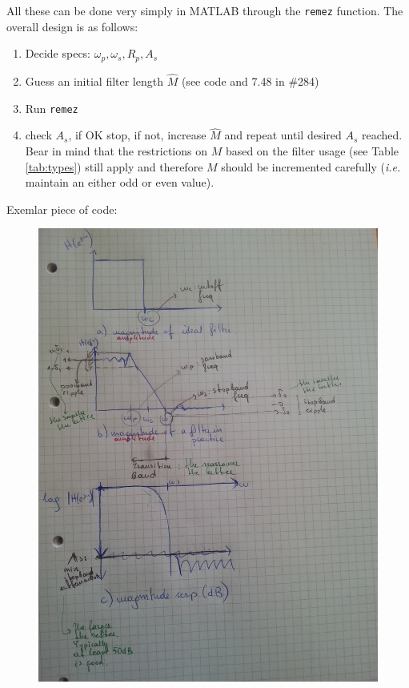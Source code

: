 \documentclass{article}
\newcommand{\ttt}[1]{\texttt{#1}}
\newcommand{\ie}{\textit{i.e. }}
\begin{document}
All these can be done very simply in MATLAB through the \ttt{remez} function. The overall design is as follows:
\begin{enumerate}
\item Decide specs: $\omega_p, \omega_s, R_p, A_s$
\item Guess an initial filter length $\hat{M}$ (see code and 7.48 in \#284)
\item Run \ttt{remez}
\item check $A_s$, if OK stop, if not, increase $\hat{M}$ and repeat until desired $A_s$ reached. Bear in mind that the restrictions on $M$ based on the filter usage (see Table \ref{tab:types}) still apply and therefore $M$ should be incremented carefully (\ie maintain an either odd or even value).
\end{enumerate}


Exemlar piece of code: 

\begin{figure}
\includegraphics[scale=0.20]{fig/fir_design.jpg}
\label{fig:design}
\end{figure}

\end{document}

